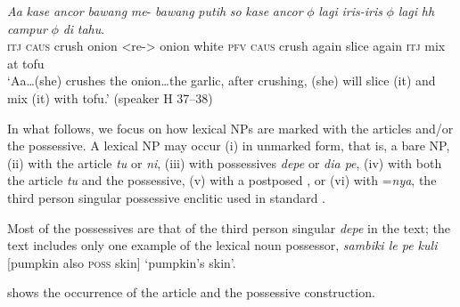 \documentclass[output=paper
,modfonts
,nonflat]{langsci/langscibook}
\begin{document}
\begin{exe}
	\ex\label{e:shiohara:21}
	\gll \textit{Aa}   \textit{kase}  \textit{ancor} \textit{bawang} {{\USSmaller}\textit{me}-{\USGreater}\footnotemark}  \textit{bawang}  \textit{putih} \textit{so}  \textit{kase}   \textit{ancor}   $\phi$  \textit{lagi} \textit{iris-iris} $\phi$  \textit{lagi}     \textit{hh} \textit{campur} $\phi$  \textit{di}   \textit{tahu}.\\
	\textsc{itj}  \textsc{caus}  crush  onion  <re-> onion white \textsc{pfv}  \textsc{caus} crush  { } again  slice { } again \textsc{itj} mix { } at tofu\\
	\glt ‘Aa…(she) crushes the onion…the garlic, after crushing, (she) will slice (it) and mix (it) with tofu.’ \hfill{(speaker H 37--38)}
\end{exe}

\noindent
In what follows, we focus on how lexical NPs are marked with the articles and/or the possessive. A lexical NP may occur (i) in unmarked form, that is, a bare NP, (ii) with the article \textit{tu} or \textit{ni}, (iii) with possessives \textit{depe} or \textit{dia pe}, (iv) with both the article \textit{tu} and the possessive, (v) with a postposed , or (vi) with =\textit{nya}, the third person singular possessive enclitic used in standard . 

Most of the possessives are that of the third person singular \textit{depe} in the text; the text includes only one example of the lexical noun possessor, \textit{sambiki le pe kuli} [pumpkin also \textsc{poss} skin] ‘pumpkin’s skin’.

 shows the occurrence of the article and the possessive construction.

\begin{table}
	\caption{Occurrence of the determiner and the possessive construction}
	\label{tab:5}
\end{table}
\end{document}
